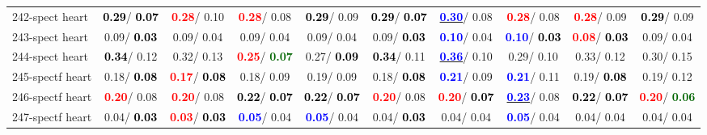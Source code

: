 \begin{table}[h]
\begin{center}
{\begin{tabular}{lc|c|c|c|c|c|c|c|c}
242-spect heart & \textcolor{black}{\textbf{  0.29}}/\textcolor{black}{\textbf{  0.07}} & \textcolor{red}{\textbf{  0.28}}/  0.10 & \textcolor{red}{\textbf{  0.28}}/  0.08 & \textcolor{black}{\textbf{  0.29}}/  0.09 & \textcolor{black}{\textbf{  0.29}}/\textcolor{black}{\textbf{  0.07}} & \underline{\textcolor{blue}{\textbf{  0.30}}}/  0.08 & \textcolor{red}{\textbf{  0.28}}/  0.08 & \textcolor{red}{\textbf{  0.28}}/  0.09 & \textcolor{black}{\textbf{  0.29}}/  0.09 \\
243-spect heart &   0.09/\textcolor{black}{\textbf{  0.03}} &   0.09/  0.04 &   0.09/  0.04 &   0.09/  0.04 &   0.09/\textcolor{black}{\textbf{  0.03}} & \textcolor{blue}{\textbf{  0.10}}/  0.04 & \textcolor{blue}{\textbf{  0.10}}/\textcolor{black}{\textbf{  0.03}} & \textcolor{red}{\textbf{  0.08}}/\textcolor{black}{\textbf{  0.03}} &   0.09/  0.04 \\
244-spect heart & \textcolor{black}{\textbf{  0.34}}/  0.12 &   0.32/  0.13 & \textcolor{red}{\textbf{  0.25}}/\textcolor{darkgreen}{\textbf{  0.07}} &   0.27/\textcolor{black}{\textbf{  0.09}} & \textcolor{black}{\textbf{  0.34}}/  0.11 & \underline{\textcolor{blue}{\textbf{  0.36}}}/  0.10 &   0.29/  0.10 &   0.33/  0.12 &   0.30/  0.15 \\
245-spectf heart &   0.18/\textcolor{black}{\textbf{  0.08}} & \textcolor{red}{\textbf{  0.17}}/\textcolor{black}{\textbf{  0.08}} &   0.18/  0.09 &   0.19/  0.09 &   0.18/\textcolor{black}{\textbf{  0.08}} & \textcolor{blue}{\textbf{  0.21}}/  0.09 & \textcolor{blue}{\textbf{  0.21}}/  0.11 &   0.19/\textcolor{black}{\textbf{  0.08}} &   0.19/  0.12 \\ \hline
246-spectf heart & \textcolor{red}{\textbf{  0.20}}/  0.08 & \textcolor{red}{\textbf{  0.20}}/  0.08 & \textcolor{black}{\textbf{  0.22}}/\textcolor{black}{\textbf{  0.07}} & \textcolor{black}{\textbf{  0.22}}/\textcolor{black}{\textbf{  0.07}} & \textcolor{red}{\textbf{  0.20}}/  0.08 & \textcolor{red}{\textbf{  0.20}}/\textcolor{black}{\textbf{  0.07}} & \underline{\textcolor{blue}{\textbf{  0.23}}}/  0.08 & \textcolor{black}{\textbf{  0.22}}/\textcolor{black}{\textbf{  0.07}} & \textcolor{red}{\textbf{  0.20}}/\textcolor{darkgreen}{\textbf{  0.06}} \\
247-spectf heart &   0.04/\textcolor{black}{\textbf{  0.03}} & \textcolor{red}{\textbf{  0.03}}/\textcolor{black}{\textbf{  0.03}} & \textcolor{blue}{\textbf{  0.05}}/  0.04 & \textcolor{blue}{\textbf{  0.05}}/  0.04 &   0.04/\textcolor{black}{\textbf{  0.03}} &   0.04/  0.04 & \textcolor{blue}{\textbf{  0.05}}/  0.04 &   0.04/  0.04 &   0.04/  0.04 \\

\end{tabular}}
\end{center}
\end{table}
